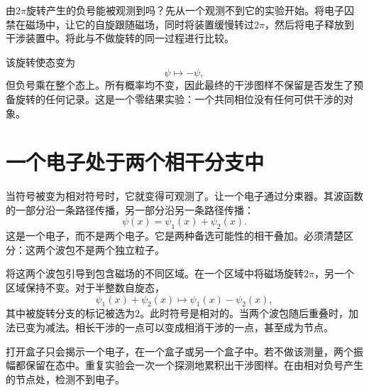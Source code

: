 由\(2\pi\)旋转产生的负号能被观测到吗？先从一个观测不到它的实验开始。将电子囚禁在磁场中，让它的自旋跟随磁场，同时将装置缓慢转过\(2\pi\)，然后将电子释放到干涉装置中。将此与不做旋转的同一过程进行比较。

该旋转使态变为
\begin{equation}
\psi\longmapsto-\psi,
\end{equation}
但负号乘在整个态上。所有概率均不变，因此最终的干涉图样不保留是否发生了预备旋转的任何记录。这是一个零结果实验：一个共同相位没有任何可供干涉的对象。

\begin{classroomqa}
\end{classroomqa}

\section{一个电子处于两个相干分支中}

当符号被变为相对符号时，它就变得可观测了。让一个电子通过分束器。其波函数的一部分沿一条路径传播，另一部分沿另一条路径传播：
\begin{equation}
\psi(x)=\psi_1(x)+\psi_2(x).
\end{equation}
这是一个电子，而不是两个电子。它是两种备选可能性的相干叠加。必须清楚区分：这两个波包不是两个独立粒子。

将这两个波包引导到包含磁场的不同区域。在一个区域中将磁场旋转\(2\pi\)，另一个区域保持不变。对于半整数自旋态，
\begin{equation}
\psi_1(x)+\psi_2(x)
\longmapsto
\psi_1(x)-\psi_2(x),
\end{equation}
其中被旋转分支的标记被选为\(2\)。此时符号是相对的。当两个波包随后重叠时，加法已变为减法。相长干涉的一点可以变成相消干涉的一点，甚至成为节点。

\begin{classroomqa}
\end{classroomqa}

打开盒子只会揭示一个电子，在一个盒子或另一个盒子中。若不做该测量，两个振幅都保留在态中。重复实验会一次一个探测地累积出干涉图样。在由相对负号产生的节点处，检测不到电子。

